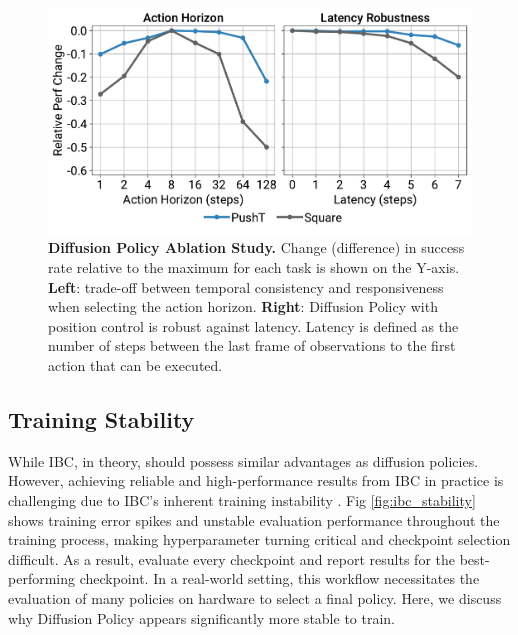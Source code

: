 \begin{figure}[h]
\centering
\includegraphics[width=\linewidth]{figure/ablation_figure.pdf}
\vspace{-6mm}

\caption{\textbf{Diffusion Policy Ablation Study.}
Change (difference) in success rate relative to the maximum for each task is shown on the Y-axis.
\textbf{Left}: trade-off between temporal consistency and responsiveness when selecting the action horizon.
\textbf{Right}: Diffusion Policy with position control is robust against latency.
Latency is defined as the number of steps between the last frame of observations to the first action that can be executed.
}
\label{fig:ablation}
\vspace{-5mm}
\end{figure}




\subsection{Training Stability}
\label{sec:ibc_stability}

While IBC, in theory, should possess similar advantages as diffusion policies. However, achieving reliable and high-performance results from IBC in practice is challenging due to IBC's inherent training instability \cite{ta2022conditional}. Fig \ref{fig:ibc_stability} shows training error spikes and unstable evaluation performance throughout the training process, making hyperparameter turning critical and checkpoint selection difficult. As a result, \citet{ibc} evaluate every checkpoint and report results for the best-performing checkpoint. In a real-world setting, this workflow necessitates the evaluation of many policies on hardware to select a final policy. Here, we discuss why Diffusion Policy appears significantly more stable to train.


